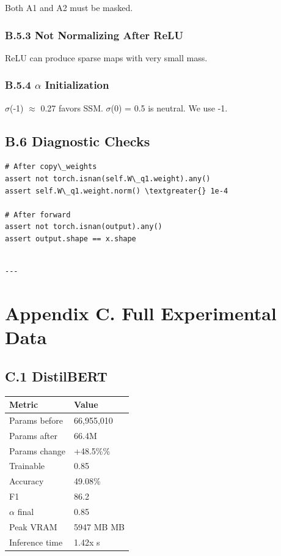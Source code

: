 Both A1 and A2 must be masked.

\subsubsection{B.5.3 Not Normalizing After ReLU}

ReLU can produce sparse maps with very small mass.

\subsubsection{B.5.4 $\alpha$ Initialization}

$\sigma$(-1) $\approx$ 0.27 favors SSM. $\sigma$(0) = 0.5 is neutral. We use -1.

\subsection{B.6 Diagnostic Checks}

\begin{lstlisting}
# After copy\_weights
assert not torch.isnan(self.W\_q1.weight).any()
assert self.W\_q1.weight.norm() \textgreater{} 1e-4

# After forward
assert not torch.isnan(output).any()
assert output.shape == x.shape
\end{lstlisting}
\begin{lstlisting}

---
\end{lstlisting}

\section{Appendix C. Full Experimental Data}

\subsection{C.1 DistilBERT}

\begin{table}[H]
\centering
\small
\begin{tabular}{ll}
\toprule
\textbf{Metric} & \textbf{Value} \\
\midrule
Params before & 66,955,010 \\
Params after & 66.4M \\
Params change & +48.5\%\% \\
Trainable & 0.85 \\
Accuracy & 49.08\% \\
F1 & 86.2 \\
$\alpha$ final & 0.85 \\
Peak VRAM & 5947 MB MB \\
Inference time & 1.42x s \\
\bottomrule
\end{tabular}
\end{table}

